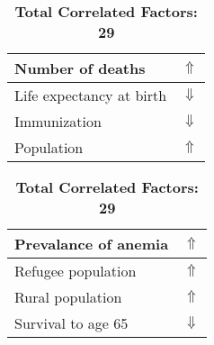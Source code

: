 \documentclass[12pt,notitlepage,oneside]{report}
\begin{document}
\begin{table}[!htb]
\begin{tabular}{|l|l|}
Number of deaths & $\Uparrow$\\ \hline
Life expectancy at birth & $\Downarrow$\\ \hline
Immunization & $\Downarrow$\\ \hline
Population & $\Uparrow$\\ \hline
\end{tabular}
\begin{tabular}{|l|l|}
\hline
Prevalance of anemia & $\Uparrow$\\ \hline
Refugee population & $\Uparrow$\\ \hline
Rural population & $\Uparrow$\\ \hline
Survival to age 65 & $\Downarrow$\\ \hline
\end{tabular}
\caption*{\textbf{Total Correlated Factors: 29}}
\end{table}
\clearpage
\end{document}
